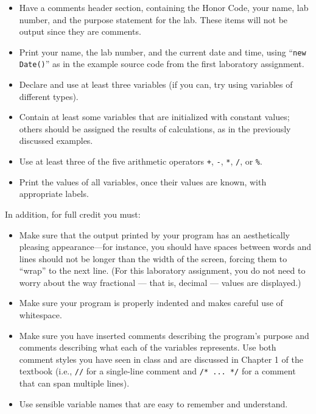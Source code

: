 \begin{itemize}
  \itemsep 0em

\item
Have a  comments header section, containing the Honor Code, your name, lab number, and the purpose statement for the lab.
These items will not be output since they are comments.
\item
Print your name, the lab number, and the current date and time, using
``{\tt new Date()}'' as in the example source code from the first laboratory assignment.
\item
Declare and use at least three variables (if you can, try using variables of different types).
\item
Contain at least some variables that are initialized with constant values; others
should be assigned the results of calculations, as in the previously discussed examples.
\item
Use at least three of the five arithmetic operators \verb$+$, \verb$-$, \verb$*$,
\verb$/$, or \verb$%$.
\item
Print the values of all variables, once their values are known, with appropriate labels.
\end{itemize}

\noindent In addition, for full credit you must:
\begin{itemize}

  \itemsep 0em

\item Make sure that the output printed by your program has an aesthetically pleasing appearance---for instance, you
  should have spaces between words and lines should not be longer than the width of the screen, forcing them to ``wrap''
  to the next line. (For this laboratory assignment, you do not need to worry about the way fractional --- that is,
  decimal --- values are displayed.)

\item Make sure your program is properly indented and makes careful use of whitespace.

\item Make sure you have inserted comments describing the program's purpose and comments describing what each of the
  variables represents. Use both comment styles you have seen in class and are discussed in Chapter 1 of the textbook
  (i.e., {\tt //} for a single-line comment and {\tt /* ...\ */} for a comment that can span multiple lines).

\item Use sensible variable names that are easy to remember and understand.

\end{itemize}


